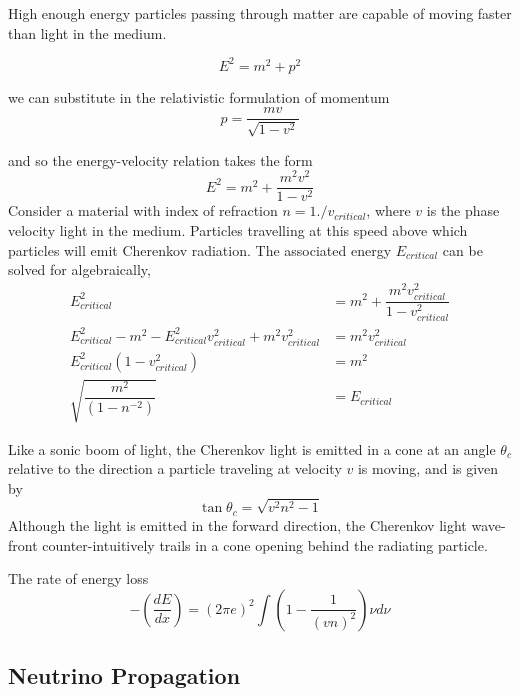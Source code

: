 \documentclass[main.tex]{subfiles}
\begin{document}
High enough energy particles passing through matter are capable of moving faster than light in the medium. 

\begin{equation}
    E^{2} = m^{2} + p^{2}
\end{equation}

we can substitute in the relativistic formulation of momentum
\begin{equation}
    p = \dfrac{mv}{\sqrt{1-v^{2}}}
\end{equation}

and so the energy-velocity relation takes the form 
\begin{equation}
    E^{2} = m^{2} + \dfrac{m^{2}v^{2}}{1-v^{2}}
\end{equation}
Consider a material with index of refraction $n = 1./v_{critical}$, where $v$ is the phase velocity light in the medium. 
Particles travelling at this speed above which particles will emit Cherenkov radiation. 
The associated energy $E_{critical}$ can be solved for algebraically,
\begin{align}
        E^{2}_{critical} &= m^{2} + \dfrac{m^{2}v_{critical}^{2}}{1-v_{critical}^{2}} \\
        E^{2}_{critical}  - m^{2} - E^{2}_{critical}v_{critical}^{2}  + m^{2}v_{critical}^{2} &= m^{2}v_{critical}^{2} \\
        E^{2}_{critical}\left(1  -v_{critical}^{2}\right) &=  m^{2} \\
        \sqrt{\dfrac{m^{2}}{\left(1  -n^{-2}\right)}} &= E_{critical} 
\end{align}

Like a sonic boom of light, the Cherenkov light is emitted in a cone at an angle $\theta_{c}$ relative to the direction a particle traveling at velocity $v$ is moving, and is given by
\begin{equation}
\tan\theta_{c} = \sqrt{v^{2}n^{2} - 1} 
\end{equation}
Although the light is emitted in the forward direction, the Cherenkov light wave-front counter-intuitively trails in a cone opening behind the radiating particle. 

The rate of energy loss 
\begin{equation}
-\left(\dfrac{dE}{dx}\right) =\left(2\pi e\right)^{2}\int \left(1-\dfrac{1}{\left(vn\right)^{2}}\right)\nu d\nu
\end{equation}

\subsection{Neutrino Propagation}
\end{document}
